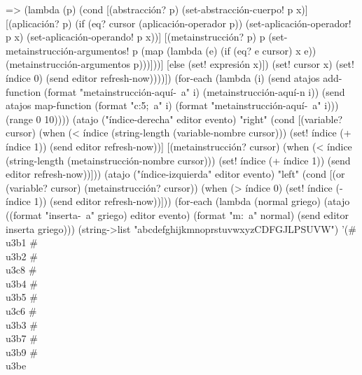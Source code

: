\documentclass[10pt,oneside,openany,letterpaper]{book}
\begin{document}
                          => (lambda (p)
                               (cond [(abstracción? p)
                                      (set-abstracción-cuerpo! p x)]
                                     [(aplicación? p)
                                      (if (eq? cursor (aplicación-operador p))
                                          (set-aplicación-operador! p x)
                                          (set-aplicación-operando! p x))]
                                     [(metainstrucción? p) p
                                      (set-metainstrucción-argumentos! p
                                       (map (lambda (e)
                                              (if (eq? e cursor) x e))
                                            (metainstrucción-argumentos p)))]))]
                         [else
                          (set! expresión x)])
                   (set! cursor x)
                   (set! índice 0)
                   (send editor refresh-now))))])
        (for-each (lambda (i)
                    (send atajos add-function (format "metainstrucción-aquí-~a" i)
                          (metainstrucción-aquí-n i))
                    (send atajos map-function (format "c:5;~a" i) (format "metainstrucción-aquí-~a" i)))
                  (range 0 10))))
    (atajo ("índice-derecha" editor evento) "right"
           (cond [(variable? cursor)
                  (when (< índice (string-length (variable-nombre cursor)))
                    (set! índice (+ índice 1))
                    (send editor refresh-now))]
                 [(metainstrucción? cursor)
                  (when (< índice (string-length (metainstrucción-nombre cursor)))
                    (set! índice (+ índice 1))
                    (send editor refresh-now))]))
    (atajo ("índice-izquierda" editor evento) "left"
           (cond [(or (variable? cursor) (metainstrucción? cursor))
                  (when (> índice 0)
                    (set! índice (- índice 1))
                    (send editor refresh-now))]))
    (for-each (lambda (normal griego)
                (atajo ((format "inserta-~a" griego) editor evento) (format "m:~a" normal)
                       (send editor inserta griego)))
              (string->list "abcdefghijkmnoprstuvwxyzCDFGJLPSUVW")
              '(#\\u3b1 #\\u3b2 #\\u3c8 #\\u3b4 #\\u3b5 #\\u3c6 #\\u3b3 #\\u3b7 #\\u3b9 #\\u3be
\end{document}
